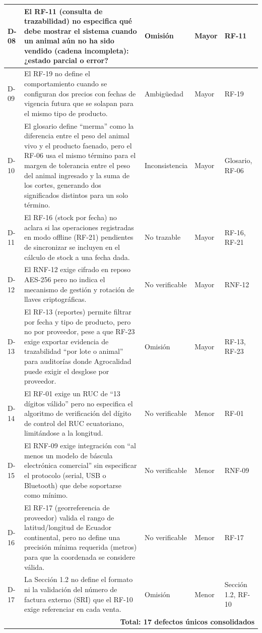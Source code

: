 \documentclass[11pt,a4paper]{article}
\begin{document}
\begin{longtable}{|p{0.8cm}|p{4.9cm}|p{2cm}|p{1.6cm}|p{2.2cm}|}
\hline
D-08 & El RF-11 (consulta de trazabilidad) no especifica qué debe mostrar el sistema cuando un animal aún no ha sido vendido (cadena incompleta): ¿estado parcial o error? & Omisión & Mayor & RF-11 \\
\hline
D-09 & El RF-19 no define el comportamiento cuando se configuran dos precios con fechas de vigencia futura que se solapan para el mismo tipo de producto. & Ambigüedad & Mayor & RF-19 \\
\hline
D-10 & El glosario define “merma” como la diferencia entre el peso del animal vivo y el producto faenado, pero el RF-06 usa el mismo término para el margen de tolerancia entre el peso del animal ingresado y la suma de los cortes, generando dos significados distintos para un solo término. & Inconsistencia & Mayor & Glosario, RF-06 \\
\hline
D-11 & El RF-16 (stock por fecha) no aclara si las operaciones registradas en modo offline (RF-21) pendientes de sincronizar se incluyen en el cálculo de stock a una fecha dada. & No trazable & Mayor & RF-16, RF-21 \\
\hline
D-12 & El RNF-12 exige cifrado en reposo AES-256 pero no indica el mecanismo de gestión y rotación de llaves criptográficas. & No verificable & Mayor & RNF-12 \\
\hline
D-13 & El RF-13 (reportes) permite filtrar por fecha y tipo de producto, pero no por proveedor, pese a que RF-23 exige exportar evidencia de trazabilidad “por lote o animal” para auditorías donde Agrocalidad puede exigir el desglose por proveedor. & Omisión & Mayor & RF-13, RF-23 \\
\hline
D-14 & El RF-01 exige un RUC de “13 dígitos válido” pero no especifica el algoritmo de verificación del dígito de control del RUC ecuatoriano, limitándose a la longitud. & No verificable & Menor & RF-01 \\
\hline
D-15 & El RNF-09 exige integración con “al menos un modelo de báscula electrónica comercial” sin especificar el protocolo (serial, USB o Bluetooth) que debe soportarse como mínimo. & No verificable & Menor & RNF-09 \\
\hline
D-16 & El RF-17 (georreferencia de proveedor) valida el rango de latitud/longitud de Ecuador continental, pero no define una precisión mínima requerida (metros) para que la coordenada se considere válida. & No verificable & Menor & RF-17 \\
\hline
D-17 & La Sección 1.2 no define el formato ni la validación del número de factura externo (SRI) que el RF-10 exige referenciar en cada venta. & Omisión & Menor & Sección 1.2, RF-10 \\
\hline
\multicolumn{5}{|r|}{\textbf{Total: 17 defectos únicos consolidados}} \\
\hline
\end{longtable}
\end{document}
